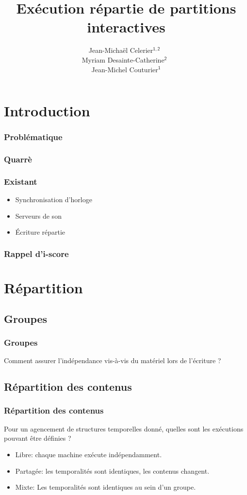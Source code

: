 \documentclass[draft,handout]{beamer}
\title{Exécution répartie de partitions interactives}
\subtitle{}
\date{}
\author{Jean-Michaël Celerier$\mathsf{^{1,2}}$~\\ Myriam Desainte-Catherine$\mathsf{^{2}}$~\\ Jean-Michel Couturier$\mathsf{^{1}}$}
\institute{1. Blue Yeti --- 2. SCRIME / LaBRI}
\begin{document}
\maketitle
\begin{frame}
    \tableofcontents
\end{frame}

\section{Introduction}
\begin{frame}
    \frametitle{Problématique}
    \Large
\end{frame}

\begin{frame}
    \frametitle{Quarrè}
    \Large
\end{frame}

\begin{frame}
    \frametitle{Existant}
    \begin{itemize}
        \item Synchronisation d'horloge
        \item Serveurs de son
        \item Écriture répartie
    \end{itemize}
\end{frame}

\begin{frame}
\frametitle{Rappel d'i-score}
\end{frame}

\section{Répartition}


\subsection{Groupes}
\begin{frame}
\frametitle{Groupes}
{\Large Comment assurer l'indépendance vis-à-vis du matériel lors de l'écriture ?}
\end{frame}


\subsection{Répartition des contenus}
\begin{frame}
\frametitle{Répartition des contenus}
{\Large Pour un agencement de structures temporelles donné, quelles sont les exécutions pouvant être définies ?}

\begin{itemize}
    \item Libre: chaque machine exécute indépendamment.
    \item Partagée: les temporalités sont identiques, les contenus changent.
    \item Mixte: Les temporalités sont identiques au sein d'un groupe.
\end{itemize}
\end{frame}
\end{document}
